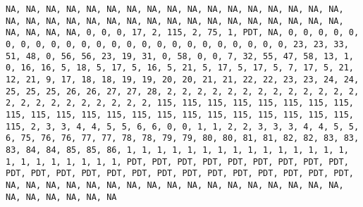 \documentclass[]{article}
\begin{document}
\begin{verbatim}
NA, NA, NA, NA, NA, NA, NA, NA, NA, NA, NA, NA, NA, NA, NA, NA, NA, NA, NA, NA, NA, NA, NA, NA, NA, NA, NA, NA, NA, NA, NA, NA, NA, NA, NA, NA, NA, NA, 0, 0, 0, 17, 2, 115, 2, 75, 1, PDT, NA, 0, 0, 0, 0, 0, 0, 0, 0, 0, 0, 0, 0, 0, 0, 0, 0, 0, 0, 0, 0, 0, 0, 0, 0, 23, 23, 33, 51, 48, 0, 56, 56, 23, 19, 31, 0, 58, 0, 0, 7, 32, 55, 47, 58, 13, 1, 0, 16, 16, 5, 18, 5, 17, 5, 16, 5, 21, 5, 17, 5, 17, 5, 7, 17, 5, 21, 12, 21, 9, 17, 18, 18, 19, 19, 20, 20, 21, 21, 22, 22, 23, 23, 24, 24, 25, 25, 25, 26, 26, 27, 27, 28, 2, 2, 2, 2, 2, 2, 2, 2, 2, 2, 2, 2, 2, 2, 2, 2, 2, 2, 2, 2, 2, 2, 2, 115, 115, 115, 115, 115, 115, 115, 115, 115, 115, 115, 115, 115, 115, 115, 115, 115, 115, 115, 115, 115, 115, 115, 2, 3, 3, 4, 4, 5, 5, 6, 6, 0, 0, 1, 1, 2, 2, 3, 3, 3, 4, 4, 5, 5, 6, 75, 76, 76, 77, 77, 78, 78, 79, 79, 80, 80, 81, 81, 82, 82, 83, 83, 83, 84, 84, 85, 85, 86, 1, 1, 1, 1, 1, 1, 1, 1, 1, 1, 1, 1, 1, 1, 1, 1, 1, 1, 1, 1, 1, 1, 1, PDT, PDT, PDT, PDT, PDT, PDT, PDT, PDT, PDT, PDT, PDT, PDT, PDT, PDT, PDT, PDT, PDT, PDT, PDT, PDT, PDT, PDT, PDT, NA, NA, NA, NA, NA, NA, NA, NA, NA, NA, NA, NA, NA, NA, NA, NA, NA, NA, NA, NA, NA, NA, NA

\end{verbatim}
\end{document}
